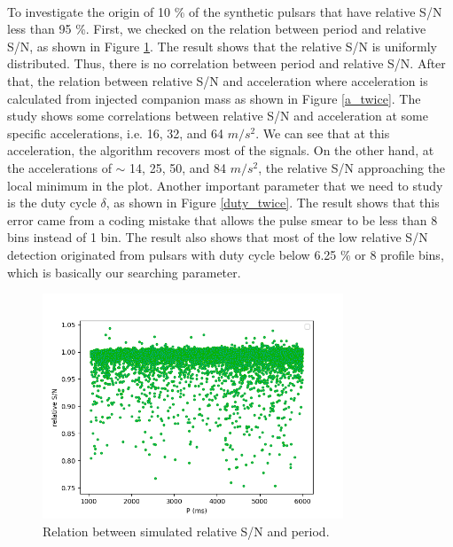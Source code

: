 \documentclass[thesis_msc.tex]{subfiles}
\begin{document}
 \paragraph{} To investigate the origin of 10 \% of the synthetic pulsars that have relative S/N less than 95 \%. First, we checked on the relation between period and relative S/N, as shown in Figure \ref{P_twice}. The result shows that the relative S/N is uniformly distributed. Thus, there is no correlation between period and relative S/N.  After that, the relation between relative S/N and acceleration where acceleration is calculated from injected companion mass as shown in Figure \ref{a_twice}. The study shows some correlations between relative S/N and acceleration at some specific accelerations, i.e. 16, 32, and 64 $m/s^2$. We can see that at this acceleration, the algorithm recovers most of the signals. On the other hand, at the accelerations of $\sim$ 14, 25, 50, and 84 $m/s^2$, the relative S/N approaching the local minimum in the plot. Another important parameter that we need to study is the duty cycle $\delta$, as shown in Figure \ref{duty_twice}. The result shows that this error came from a coding mistake that allows the pulse smear to be less than 8 bins instead of 1 bin. The result also shows that most of the low relative S/N detection originated from pulsars with duty cycle below 6.25 \% or 8 profile bins, which is basically our searching parameter.   
 



 \begin{figure}[h]
\centering
\includegraphics[width=0.80\textwidth]{figures/P_twice}
\caption{Relation between simulated relative S/N and period.  }\label{P_twice}
\end{figure}
\end{document}
